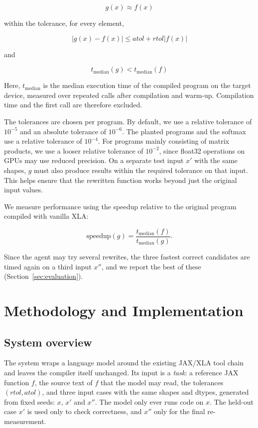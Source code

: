 \documentclass[conference]{IEEEtran}
\begin{document}
\[g(x) \approx f(x)\]

within the tolerance, for every element,

\[|g(x)-f(x)| \leq atol + rtol|f(x)|\]

and

\[t_{\text{median}}(g) < t_{\text{median}}(f)\]

Here, \(t_{\text{median}}\) is the median execution time of the compiled program on the target device, measured over repeated calls after compilation and warm-up. Compilation time and the first call are therefore excluded.

The tolerances are chosen per program. By default, we use a relative tolerance of \(10^{-5}\) and an absolute tolerance of \(10^{-6}\). The planted programs and the softmax use a relative tolerance of \(10^{-4}\). For programs mainly consisting of matrix products, we use a looser relative tolerance of \(10^{-2}\), since float32 operations on GPUs may use reduced precision. On a separate test input \(x'\) with the same shapes, \(g\) must also produce results within the required tolerance on that input. This helps ensure that the rewritten function works beyond just the original input values.

We measure performance using the speedup relative to the original program compiled with vanilla XLA:

\[\text{speedup}(g) =\frac{t_{\text{median}}(f)}
{t_{\text{median}}(g)}.
\]

Since the agent may try several rewrites, the three fastest correct candidates are timed again on a third input \(x''\), and we report the best of these (Section~\ref{sec:evaluation}).


\section{Methodology and Implementation}
\subsection{System overview}
The system wraps a language model around the existing JAX/XLA tool chain
and leaves the compiler itself unchanged. Its input is a \emph{task}: a
reference JAX function $f$, the source text of $f$ that the model may read,
the tolerances $(\mathit{rtol}, \mathit{atol})$, and three input cases with
the same shapes and dtypes, generated from fixed seeds: $x$, $x'$ and $x''$.
The model only ever runs code on $x$. The held-out case $x'$ is used only to
check correctness, and $x''$ only for the final re-measurement.
\end{document}
